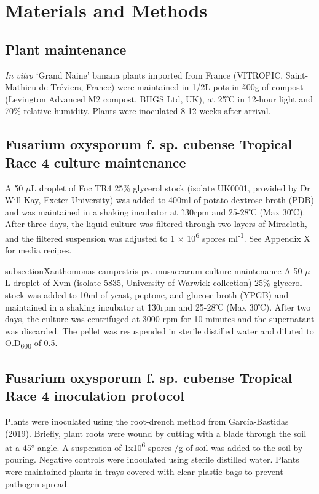 \newpage
\section{Materials and Methods}\label{sec:Chapter4_MM}
\subsection{Plant maintenance }
\textit{In vitro }‘Grand Naine’ banana plants imported from France (VITROPIC, Saint-Mathieu-de-Tréviers, France) were maintained in 1/2L pots in \~400g of compost (Levington Advanced M2 compost, BHGS Ltd, UK), at 25℃ in 12-hour light and 70\% relative humidity. Plants were inoculated 8-12 weeks after arrival. 

\subsection{Fusarium oxysporum f. sp. cubense Tropical Race 4 culture maintenance}
A 50 \(\mu\)L droplet of Foc TR4 25\% glycerol stock (isolate UK0001, provided by Dr Will Kay, Exeter University) was added to 400ml of potato dextrose broth (PDB) and was maintained in a shaking incubator at \~130rpm and 25-28℃ (Max 30℃). After three days, the liquid culture was filtered through two layers of Miracloth, and the filtered suspension was adjusted to 1 × 10\textsuperscript{6} spores ml\textsuperscript{-1}. See Appendix X for media recipes.

subsection{Xanthomonas campestris pv. musacearum culture maintenance}
A 50 \(\mu\)L droplet of Xvm (isolate 5835, University of Warwick collection) 25\% glycerol stock was added to 10ml of yeast, peptone, and glucose broth (YPGB) and maintained in a shaking incubator at \~130rpm and 25-28℃ (Max 30℃). After two days, the culture was centrifuged at 3000 rpm for 10 minutes and the supernatant was discarded. The pellet was resuspended in sterile distilled water and diluted to O.D\textsubscript{600} of 0.5. 

\subsection{Fusarium oxysporum f. sp. cubense Tropical Race 4 inoculation protocol}
Plants were inoculated using the root-drench method from García-Bastidas \et (2019). Briefly, plant roots were wound by cutting with a blade through the soil at a 45° angle. A suspension of 1x10\textsuperscript{6} spores /g of soil was added to the soil by pouring. Negative controls were inoculated using sterile distilled water. Plants were maintained plants in trays covered with clear plastic bags to prevent pathogen spread. 

